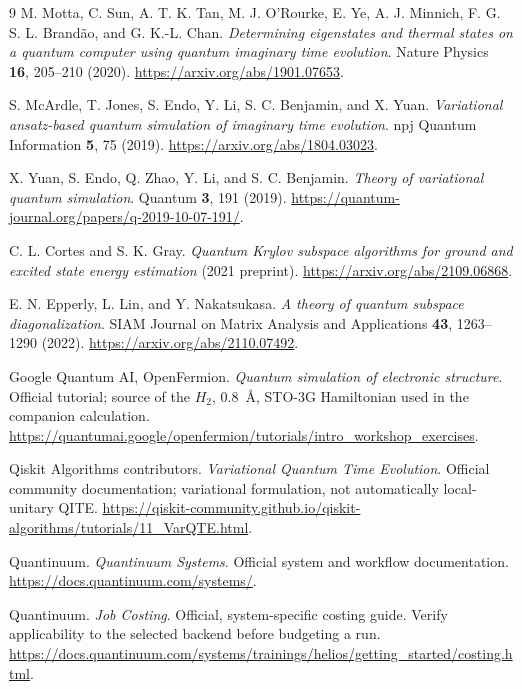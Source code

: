 \documentclass[11pt,a4paper]{article}
\begin{document}
\begin{thebibliography}{9}
\small
{} M. Motta, C. Sun, A. T. K. Tan, M. J. O'Rourke, E. Ye, A. J. Minnich, F. G. S. L. Brand\~ao, and G. K.-L. Chan.
\emph{Determining eigenstates and thermal states on a quantum computer using quantum imaginary time evolution}. Nature Physics \textbf{16}, 205--210 (2020).
\url{https://arxiv.org/abs/1901.07653}.

 S. McArdle, T. Jones, S. Endo, Y. Li, S. C. Benjamin, and X. Yuan.
\emph{Variational ansatz-based quantum simulation of imaginary time evolution}. npj Quantum Information \textbf{5}, 75 (2019).
\url{https://arxiv.org/abs/1804.03023}.

 X. Yuan, S. Endo, Q. Zhao, Y. Li, and S. C. Benjamin.
\emph{Theory of variational quantum simulation}. Quantum \textbf{3}, 191 (2019).
\url{https://quantum-journal.org/papers/q-2019-10-07-191/}.

 C. L. Cortes and S. K. Gray.
\emph{Quantum Krylov subspace algorithms for ground and excited state energy estimation} (2021 preprint).
\url{https://arxiv.org/abs/2109.06868}.

 E. N. Epperly, L. Lin, and Y. Nakatsukasa.
\emph{A theory of quantum subspace diagonalization}. SIAM Journal on Matrix Analysis and Applications \textbf{43}, 1263--1290 (2022).
\url{https://arxiv.org/abs/2110.07492}.

 Google Quantum AI, OpenFermion.
\emph{Quantum simulation of electronic structure}. Official tutorial; source of the $H_2$, $0.8$~\AA, STO-3G Hamiltonian used in the companion calculation.
\url{https://quantumai.google/openfermion/tutorials/intro_workshop_exercises}.

 Qiskit Algorithms contributors.
\emph{Variational Quantum Time Evolution}. Official community documentation; variational formulation, not automatically local-unitary QITE.
\url{https://qiskit-community.github.io/qiskit-algorithms/tutorials/11_VarQTE.html}.

 Quantinuum.
\emph{Quantinuum Systems}. Official system and workflow documentation.
\url{https://docs.quantinuum.com/systems/}.

 Quantinuum.
\emph{Job Costing}. Official, system-specific costing guide. Verify applicability to the selected backend before budgeting a run.
\url{https://docs.quantinuum.com/systems/trainings/helios/getting_started/costing.html}.
\end{thebibliography}
\end{document}
